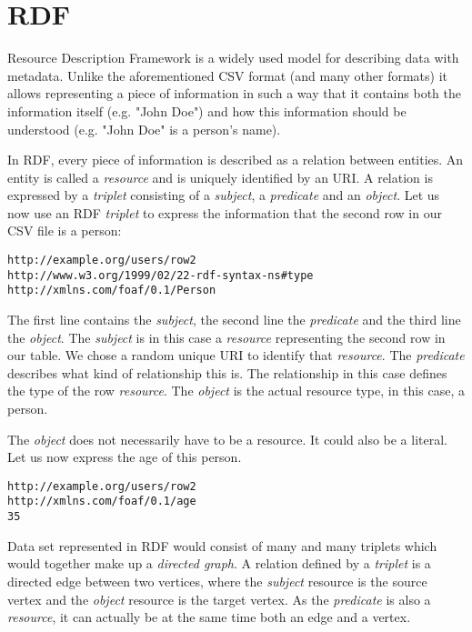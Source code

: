 \section{RDF}

Resource Description Framework \cite{rdf} is a widely used model for describing data with metadata. Unlike the aforementioned CSV format (and many other formats) it allows representing a piece of information in such a way that it contains both the information itself (e.g. "John Doe") and how this information should be understood (e.g. "John Doe" is a person's name). 

In RDF, every piece of information is described as a relation between entities. An entity is called a \emph{resource} and is uniquely identified by an URI. A relation is expressed by a \emph{triplet} consisting of a \emph{subject}, a \emph{predicate} and an \emph{object}. Let us now use an RDF \emph{triplet} to express the information that the second row in our CSV file is a person:

\begin{verbatim}
http://example.org/users/row2
http://www.w3.org/1999/02/22-rdf-syntax-ns#type 
http://xmlns.com/foaf/0.1/Person
\end{verbatim}

The first line contains the \emph{subject}, the second line the \emph{predicate} and the third line the \emph{object}. The \emph{subject} is in this case a \emph{resource} representing the second row in our table. We chose a random unique URI to identify that \emph{resource}. The \emph{predicate} describes what kind of relationship this is. The relationship in this case defines the type of the row \emph{resource}. The \emph{object} is the actual resource type, in this case, a person.

The \emph{object} does not necessarily have to be a resource. It could also be a literal. Let us now express the age of this person.

\begin{verbatim}
http://example.org/users/row2
http://xmlns.com/foaf/0.1/age
35
\end{verbatim}

Data set represented in RDF would consist of many and many triplets which would together make up a \emph{directed graph}. A relation defined by a \emph{triplet} is a directed edge between two vertices, where the \emph{subject} resource is the source vertex and the \emph{object} resource is the target vertex. As the \emph{predicate} is also a \emph{resource}, it can actually be at the same time both an edge and a vertex.

